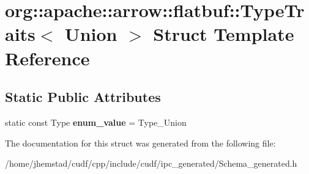 \hypertarget{structorg_1_1apache_1_1arrow_1_1flatbuf_1_1TypeTraits_3_01Union_01_4}{}\section{org\+:\+:apache\+:\+:arrow\+:\+:flatbuf\+:\+:Type\+Traits$<$ Union $>$ Struct Template Reference}
\label{structorg_1_1apache_1_1arrow_1_1flatbuf_1_1TypeTraits_3_01Union_01_4}
\subsection*{Static Public Attributes}
\begin{DoxyCompactItemize}
\item 
static const Type {\bfseries enum\+\_\+value} = Type\+\_\+\+Union\hypertarget{structorg_1_1apache_1_1arrow_1_1flatbuf_1_1TypeTraits_3_01Union_01_4_a57f75e22f3c4c93c7d0a5dd05207ce76}{}\label{structorg_1_1apache_1_1arrow_1_1flatbuf_1_1TypeTraits_3_01Union_01_4_a57f75e22f3c4c93c7d0a5dd05207ce76}

\end{DoxyCompactItemize}


The documentation for this struct was generated from the following file\+:\begin{DoxyCompactItemize}
\item 
/home/jhemstad/cudf/cpp/include/cudf/ipc\+\_\+generated/Schema\+\_\+generated.\+h\end{DoxyCompactItemize}

